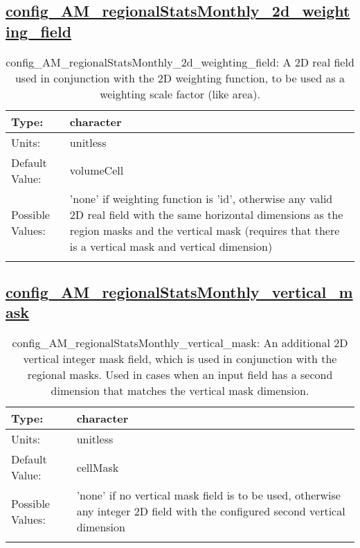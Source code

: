 \subsection[config\_AM\_regionalStatsMonthly\_2d\_weighting\_field]{\hyperref[sec:nm_tab_AM_regionalStatsMonthly]{config\_AM\_regionalStatsMonthly\_2d\_weighting\_field}}
\label{subsec:nm_sec_config_AM_regionalStatsMonthly_2d_weighting_field}
\begin{center}
\begin{longtable}{| p{2.0in} || p{4.0in} |}
    \hline
    Type: & character \\
    \hline
    Units: & \si{unitless} \\
    \hline
    Default Value: & volumeCell \\
    \hline
    Possible Values: & 'none' if weighting function is 'id', otherwise any valid 2D real field with the same horizontal dimensions as the region masks and the vertical mask (requires that there is a vertical mask and vertical dimension) \\
    \hline
    \caption{config\_AM\_regionalStatsMonthly\_2d\_weighting\_field: A 2D real field used in conjunction with the 2D weighting function, to be used as a weighting scale factor (like area).}
\end{longtable}
\end{center}
\subsection[config\_AM\_regionalStatsMonthly\_vertical\_mask]{\hyperref[sec:nm_tab_AM_regionalStatsMonthly]{config\_AM\_regionalStatsMonthly\_vertical\_mask}}
\label{subsec:nm_sec_config_AM_regionalStatsMonthly_vertical_mask}
\begin{center}
\begin{longtable}{| p{2.0in} || p{4.0in} |}
    \hline
    Type: & character \\
    \hline
    Units: & \si{unitless} \\
    \hline
    Default Value: & cellMask \\
    \hline
    Possible Values: & 'none' if no vertical mask field is to be used, otherwise any integer 2D field with the configured second vertical dimension \\
    \hline
    \caption{config\_AM\_regionalStatsMonthly\_vertical\_mask: An additional 2D vertical integer mask field, which is used in conjunction with the regional masks. Used in cases when an input field has a second dimension that matches the vertical mask dimension.}
\end{longtable}
\end{center}

